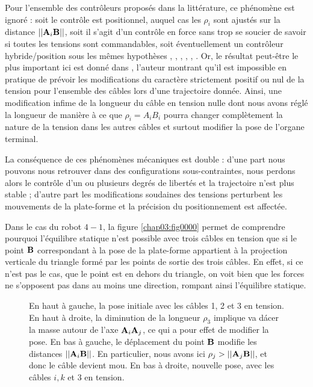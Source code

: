 Pour l'ensemble des contrôleurs proposés dans la littérature, ce phénomène est 
ignoré : soit le contrôle est positionnel, auquel cas les $\rho_i$ sont ajustés 
sur la distance $||{\bf A}_i {\bf B}||$, soit il s'agit d'un contrôle en force 
sans trop se soucier de savoir si toutes les tensions sont commandables, soit 
éventuellement un contrôleur hybride/position sous les mêmes hypothèses 
\cite{taghirad2011}, \cite{bedoustani2010}, \cite{weijung2000}, 
\cite{hassan2007}, \cite{arsenault2010}, \cite{lenarcic2002}. Or, le r\'esultat 
peut-\^etre le plus important ici est donn\'e dans \cite{merlet2014check}, 
l'auteur montrant qu'il est impossible en pratique de pr\'evoir les 
modifications du caract\`ere strictement positif ou nul de la tension pour 
l'ensemble des c\^ables lors d'une trajectoire donn\'ee. Ainsi, une modification 
infime de la longueur du c\^able en tension nulle dont nous avons r\'egl\'e la 
longueur de mani\`ere \`a ce que $\rho_i = A_iB_i$ pourra changer compl\`etement 
la nature de la tension dans les autres c\^ables et surtout modifier la pose de 
l'organe terminal.

La cons\'equence de ces ph\'enom\`enes m\'ecaniques est double : d'une part
nous pouvons nous retrouver dans des configurations sous-contraintes, nous
perdons alors le contr\^ole d'un ou plusieurs degr\'es de libert\'es et la
trajectoire n'est plus stable ; d'autre part les modifications soudaines des
tensions perturbent les mouvements de la plate-forme et la pr\'ecision du
positionnement est affect\'ee.

Dans le cas du robot $4-1$, la figure \ref{chap03:fig0000} permet de 
comprendre pourquoi l'équilibre statique n'est possible avec trois câbles en 
tension que si le point ${\bf B}$ correspondant à la pose de la plate-forme 
appartient à la projection verticale du triangle formé par les points de sortie 
des trois câbles. En effet, si ce n'est pas le cas, que le point est en dehors 
du triangle, on voit bien que les forces ne s'opposent pas dans au moins une 
direction, rompant ainsi l'équilibre statique.

\begin{figure}[!ht]
  \centering
    \def\svgwidth{.65\linewidth}
  
    \caption{\footnotesize{En haut \`a gauche, la pose initiale avec les 
c\^ables 1, 2 et 3 en tension. En haut \`a droite, la diminution de la 
longueur $\rho_3$ implique va d\'acer la masse autour de l'axe ${\bf 
A}_i{\bf A}_j$, ce qui a pour effet de modifier la pose. En bas \`a gauche, le 
d\'eplacement du point $\bf B$ modifie les distances $||{\bf A}_i{\bf B}||$. En 
particulier, nous avons ici $\rho_j > ||{\bf A}_j{\bf B}||$, et donc le c\^able 
devient mou. En bas \`a droite, nouvelle pose, avec les c\^ables $i, k$ et $3$ 
en tension.}}
\label{chap03:fig0001}
\end{figure}

